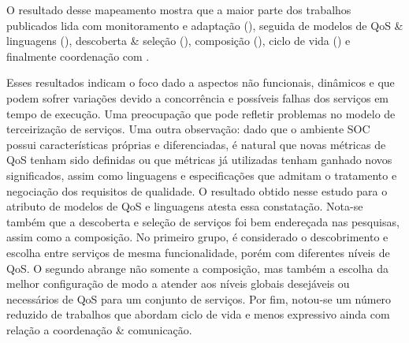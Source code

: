 O resultado desse mapeamento mostra que a maior parte dos trabalhos publicados lida com monitoramento e adapta\c{c}\~{a}o (\MonitoramentoAdaptacao), seguida de modelos de QoS \& linguagens (\ModelosdeQoSeLinguagens), descoberta \& sele\c{c}\~{a}o (\DescobrimentoSelecao),  composi\c{c}\~{a}o (\Composicao), ciclo de vida (\Ciclodevida) e finalmente coordenação com \CoodenacaoComunicacao.

Esses resultados indicam o foco dado a aspectos não funcionais, dinâmicos e que podem sofrer variações devido a concorrência e poss\'{i}veis falhas dos servi\c{c}os em tempo de execu\c{c}\~{a}o. Uma preocupa\c{c}\~{a}o que pode refletir problemas no modelo de terceirização de serviços. Uma outra observa\c{c}\~{a}o: dado que o ambiente SOC possui características próprias e diferenciadas, é natural que novas métricas de QoS tenham sido definidas ou que métricas já utilizadas tenham ganhado novos significados, assim como linguagens e especificações que admitam o tratamento e negociação dos requisitos de qualidade. O resultado obtido nesse estudo para o atributo de modelos de QoS e linguagens atesta essa constatação. Nota-se também que a descoberta e seleção de serviços foi bem endereçada nas pesquisas, assim como a composição. No primeiro grupo, é considerado o descobrimento e escolha entre serviços de mesma funcionalidade, porém com diferentes níveis de QoS. O segundo abrange não somente a composição, mas também a escolha da melhor configuração de modo a atender aos níveis globais desejáveis ou necessários de QoS para um conjunto de serviços. Por fim, notou-se um número reduzido de trabalhos que abordam ciclo de vida e menos expressivo ainda com rela\c{c}\~{a}o a coordenação \& comunicação. 